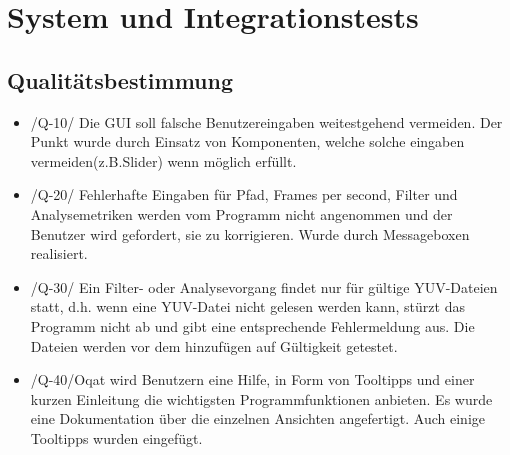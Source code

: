 \chapter{System und Integrationstests}
\section{Qualitätsbestimmung}
\begin{itemize}
\item /Q-10/ Die GUI soll falsche Benutzereingaben weitestgehend vermeiden. \newline
Der Punkt wurde durch Einsatz von Komponenten, welche solche eingaben vermeiden(z.B.Slider) wenn möglich erfüllt.
\item /Q-20/ Fehlerhafte Eingaben für Pfad, Frames per second, Filter und Analysemetriken werden vom Programm nicht angenommen und der Benutzer wird gefordert, sie zu korrigieren. \newline
Wurde durch Messageboxen realisiert.
\item /Q-30/ Ein Filter- oder Analysevorgang findet nur für gültige YUV-Dateien statt, d.h. wenn eine YUV-Datei nicht gelesen werden kann, stürzt das Programm nicht ab und gibt eine entsprechende Fehlermeldung aus. \newline
Die Dateien werden vor dem hinzufügen auf Gültigkeit getestet.
\item  /Q-40/Oqat wird Benutzern eine Hilfe, in Form von Tooltipps und einer kurzen Einleitung die wichtigsten Programmfunktionen anbieten. \newline
Es wurde eine Dokumentation über die einzelnen Ansichten angefertigt. Auch einige Tooltipps wurden eingefügt.

\end{itemize}
